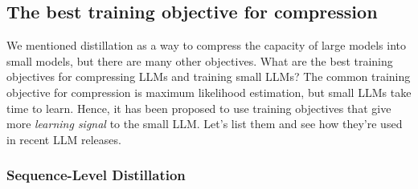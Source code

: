\subsection{The best training objective for compression}
We mentioned distillation as a way to compress the capacity of large models into small models,
but there are many other objectives.
What are the best training objectives for compressing LLMs and training
small LLMs? The common training objective for compression is maximum likelihood
estimation, but small LLMs take time to learn. Hence,
it has been proposed to use training objectives that give more \textit{learning signal}
to the small LLM. Let's list them and see how they're used in recent LLM releases.

\subsubsection{Sequence-Level Distillation}
